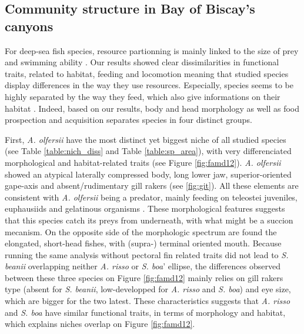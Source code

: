 
\subsection{Community structure in Bay of Biscay's canyons}

For deep-sea fish species, resource partionning is mainly linked to the size of prey and swimming ability \citep{aneeshkumar2017}. Our results showed clear dissimilarities in functional traits, related to habitat, feeding and locomotion meaning that studied species display differences in the way they use resources. Especially, species seems to be highly separated by the way they feed, which also give informations on their habitat \citep{schoenfuss2007}. Indeed, based on our results, body and head morphology as well as food prospection and acquisition separates species in four distinct groups.

First, \textit{A. olfersii} have the most distinct yet biggest niche of all studied species (see Table \ref{table:nich_diss} and Table \ref{table:sp_area}), with very differenciated morphological and habitat-related traits (see Figure \ref{fig:famd12}). \textit{A. olfersii} showed an atypical laterally compressed body, long lower jaw, superior-oriented gape-axis and absent/rudimentary gill rakers (see \ref{fig:git}). All these elements are consistent with \textit{A. olfersii} being a predator, mainly feeding on teleostei juveniles, euphausiids and gelatinous organisms \citep{eduardo2020}. These morphological features suggests that this species catch its preys from underneath, with what might be a succion mecanism. On the opposite side of the morphologic spectrum are found the elongated, short-head fishes, with (supra-) terminal oriented mouth. Because running the same analysis without pectoral fin related traits did not lead to \textit{S. beanii} overlapping neither \textit{A. risso} or \textit{S. boa}' ellipse, the differences observed between these three species on Figure \ref{fig:famd12} mainly relies on gill rakers type (absent for \textit{S. beanii}, low-developped for \textit{A. risso} and \textit{S. boa}) and eye size, which are bigger for the two latest. These characteristics suggests that \textit{A. risso} and \textit{S. boa} have similar functional traits, in terms of morphology and habitat, which explains niches overlap on Figure \ref{fig:famd12}. 


